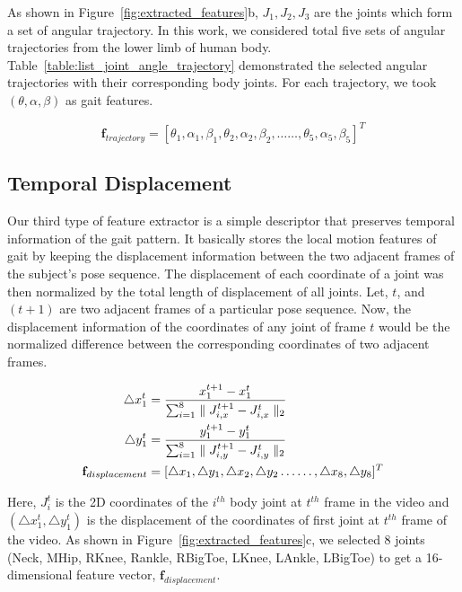 As shown in Figure~\ref{fig:extracted_features}b, $J_1, J_2, J_3$ are the joints which form a set of angular trajectory. In this work, we considered total five sets of angular trajectories from the lower limb of human body. Table~\ref{table:list_joint_angle_trajectory} demonstrated the selected angular trajectories with their corresponding body joints. For each trajectory, we took $(\theta, \alpha, \beta)$ as gait features. 

\begin{equation}
\textbf {f}_{trajectory}= [\theta_1, \alpha_1, \beta_1,\theta_2, \alpha_2, \beta_2,\ldots\ldots, \theta_5, \alpha_5, \beta_5]^T
\end{equation}


\subsection{Temporal Displacement}
Our third type of feature extractor is a simple descriptor that preserves temporal information of the gait pattern. It basically stores the local motion features of gait by keeping the displacement information between the two adjacent frames of the subject's pose sequence. The displacement of each coordinate of a joint was then normalized by the total length of displacement of all joints. Let, $t$, and $(t + 1)$ are two adjacent frames of a particular pose sequence. Now, the displacement information of the coordinates of any joint of frame $t$ would be the normalized difference between the corresponding coordinates of two adjacent frames. 

\begin{equation}
\begin{split}
\triangle x^{t}_{1} &=\frac{x^{t+1}_{1} - x^{t}_{1}}{\sum_{i=1}^{8}\parallel J^{t+1}_{i,x} - J^{t}_{i,x}\parallel_2} \\ 
\triangle y^{t}_{1} &=\frac{y^{t+1}_{1} - y^{t}_{1}}{\sum_{i=1}^{8}\parallel J^{t+1}_{i,y} - J^{t}_{i,y}\parallel_2} \\ 
{\bf f}_{displacement} &= [\triangle x_{1}, \triangle y_{1}, \triangle x_{2}, \triangle y_{2} \ldots\ldots, \triangle x_{8}, \triangle y_{8}]^{T}
\end{split}
\end{equation}

Here, $J_i^{t}$ is the 2D coordinates of the $i^{th}$ body joint at $t^{th}$ frame in the video and $(\triangle x_1^t , \triangle y_1^t )$ is the displacement of the coordinates of first joint at $t^{th}$ frame of the video. As shown in Figure~\ref{fig:extracted_features}c, we selected 8 joints (Neck, MHip, RKnee, Rankle, RBigToe, LKnee, LAnkle, LBigToe) to get a 16-dimensional feature vector, $\textbf{f}_{displacement}$.


